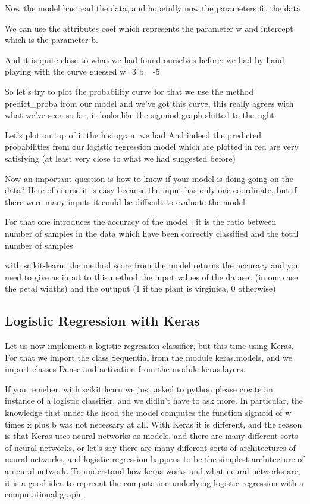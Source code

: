 \documentclass{article}
\begin{document}
Now the model has read the data, and hopefully now the parameters fit the data

We can use the attributes coef which represents the parameter w and intercept 
which is the parameter b.

And it is quite close to what we had found ourselves before: we had by hand playing 
with the curve guessed w=3 b =-5

So let's try to plot the probability curve
for that we use the method predict\_proba from our model
and we've got this curve,
this really agrees with what we've seen so far, it looks like the sigmiod graph 
shifted to the right

Let's plot on top of it the histogram we had
And indeed the predicted probabilities from our logistic regression model 
which are plotted in red are very satisfying (at least very close 
to what we had suggested before)

Now an important question is how to know if your model is doing going 
on the data?
Here of course it is easy because the input has only one coordinate, 
but if there were many inputs it could be difficult to evaluate the model.

For that one introduces the accuracy of the model : 
it is the ratio between number of samples in the data which have 
been correctly classified and the total number of samples

with scikit-learn, the method score from the model returns the accuracy
and you need to give as input to this method the 
input values of the dataset (in our case the petal widths) 
and the outuput (1 if the plant is virginica, 0 otherwise)

\subsection{Logistic Regression with Keras}

Let us now implement a  logistic regression classifier, 
but this time using Keras.
For that we import the class Sequential from the module keras.models,
and we import classes Dense and activation from the module keras.layers.

If you remeber, with scikit learn we just asked to python please create an 
instance of a logistic classifier, and we didin't have to ask more. 
In particular, the knowledge that under the hood the model computes the function 
sigmoid of w times x plus b was not necessary at all.
With Keras it is different, and the reason is that Keras uses neural networks 
as models, and there are many different sorts of neural networks, 
or let's say there are many different sorts of architectures of neural networks, 
and logistic regression happens to be the simplest architecture of a neural network.
To understand how keras works and what neural networks are, it is a good 
idea to repreent the computation underlying logistic regression with a computational 
graph.
\end{document}
